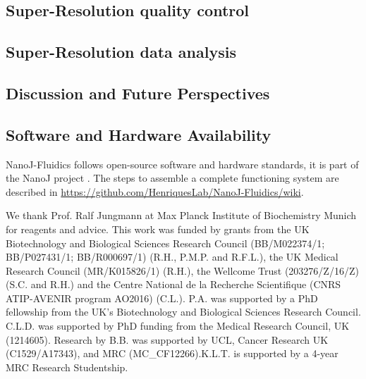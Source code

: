 \subsection*{Super-Resolution quality control}
\Blindtext

\subsection*{Super-Resolution data analysis}
\Blindtext

\subsection*{Discussion and Future Perspectives}
\Blindtext

\subsection*{Software and Hardware Availability}
NanoJ-Fluidics follows open-source software and hardware standards, it is part of the NanoJ project \cite{gustafsson2016fast, culley2018quantitative,gray2016virusmapper}. The steps to assemble a complete functioning system are described in \href{https://github.com/HenriquesLab/NanoJ-Fluidics/wiki}{https://github.com/HenriquesLab/NanoJ-Fluidics/wiki}. 

\begin{acknowledgements}
    We thank Prof. Ralf Jungmann at Max Planck Institute of Biochemistry Munich for reagents and advice. This work was funded by grants from the UK Biotechnology and Biological Sciences Research Council (BB/M022374/1; BB/P027431/1; BB/R000697/1) (R.H., P.M.P. and R.F.L.), the UK Medical Research Council (MR/K015826/1) (R.H.), the Wellcome Trust (203276/Z/16/Z) (S.C. and R.H.) and the Centre National de la Recherche Scientifique (CNRS ATIP-AVENIR program AO2016) (C.L.). P.A. was supported by a PhD fellowship from the UK’s Biotechnology and Biological Sciences Research Council. C.L.D. was supported by PhD funding from the Medical Research Council, UK (1214605). Research by B.B. was supported by UCL, Cancer Research UK (C1529/A17343), and MRC (MC\_CF12266).K.L.T. is supported
    by a 4-year MRC Research Studentship.
\end{acknowledgements}


